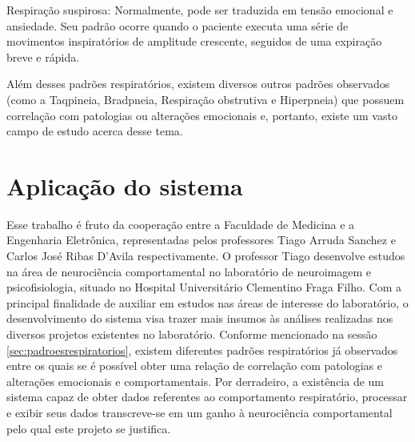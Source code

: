	Respiração suspirosa: Normalmente, pode ser traduzida em tensão emocional e ansiedade. Seu padrão ocorre quando o paciente executa uma série de movimentos inspiratórios de amplitude crescente, seguidos de uma expiração breve e rápida.
	
	Além desses padrões respiratórios, existem diversos outros padrões observados (como a Taqpineia, Bradpneia, Respiração obstrutiva e Hiperpneia) que possuem correlação com patologias ou alterações emocionais e, portanto, existe um vasto campo de estudo acerca desse tema.
	
\section{Aplicação do sistema}

	Esse trabalho é fruto da cooperação entre a Faculdade de Medicina e a Engenharia Eletrônica, representadas pelos professores Tiago Arruda Sanchez e Carlos José Ribas D'Avila respectivamente. O professor Tiago desenvolve estudos na área de neurociência comportamental no laboratório de neuroimagem e psicofisiologia, situado no Hospital Universitário Clementino Fraga Filho. Com a principal finalidade de auxiliar em estudos nas áreas de interesse do laboratório, o desenvolvimento do sistema visa trazer mais insumos às análises realizadas nos diversos projetos existentes no laboratório. Conforme mencionado na sessão \ref{sec:padroesrespiratorios}, existem diferentes padrões respiratórios já observados entre os quais se é possível obter uma relação de correlação com patologias e alterações emocionais e comportamentais. Por derradeiro, a existência de um sistema capaz de obter dados referentes ao comportamento respiratório, processar e exibir seus dados transcreve-se em um ganho à neurociência comportamental pelo qual este projeto se justifica.
